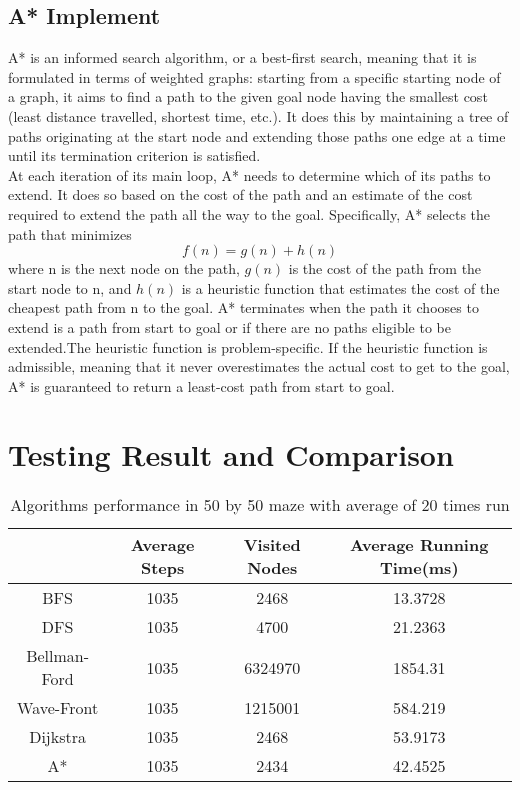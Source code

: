 \documentclass[11pt, onecolumn, letterpaper]{article}
\begin{document}
\subsection{A* Implement}
A* is an informed search algorithm, or a best-first search, meaning that it is formulated in terms of weighted graphs: starting from a specific starting node of a graph, it aims to find a path to the given goal node having the smallest cost (least distance travelled, shortest time, etc.). It does this by maintaining a tree of paths originating at the start node and extending those paths one edge at a time until its termination criterion is satisfied.\\
At each iteration of its main loop, A* needs to determine which of its paths to extend. It does so based on the cost of the path and an estimate of the cost required to extend the path all the way to the goal. Specifically, A* selects the path that minimizes
$$f(n)=g(n)+h(n)$$
where n is the next node on the path, $g(n)$ is the cost of the path from the start node to n, and $h(n)$ is a heuristic function that estimates the cost of the cheapest path from n to the goal. A* terminates when the path it chooses to extend is a path from start to goal or if there are no paths eligible to be extended.The heuristic function is problem-specific. If the heuristic function is admissible, meaning that it never overestimates the actual cost to get to the goal, A* is guaranteed to return a least-cost path from start to goal.

\section{Testing Result and Comparison}
\begin{table}[htbp]
\begin{center}
\begin{tabular}{|c| c c c|}
\hline
 & Average Steps & Visited Nodes & Average Running Time(ms)\\
\hline
BFS & 1035 & 2468 & 13.3728\\
DFS & 1035 & 4700 &21.2363\\
Bellman-Ford & 1035 & 6324970 & 1854.31\\
Wave-Front & 1035 & 1215001 & 584.219\\
Dijkstra & 1035 & 2468 & 53.9173\\
A* & 1035 & 2434 & 42.4525\\
\hline
\end{tabular}
\end{center}
\caption{Algorithms performance in 50 by 50 maze with average of 20 times run}
\end{table}
\end{document}
